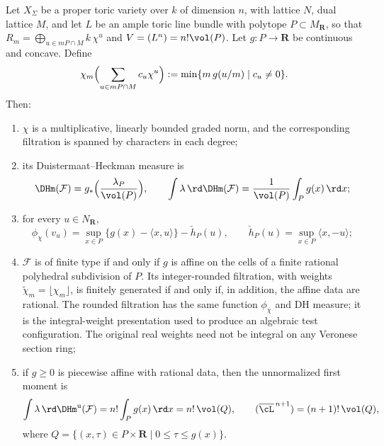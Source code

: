 \begin{theorem}
\label{thm:ch33-toric}
Let $X_\Sigma$ be a proper toric variety over $k$ of dimension $n$,
with lattice $N$, dual lattice $M$, and let $L$ be an ample toric
line bundle with polytope $P\subset M_{\mathbf R}$, so that
$R_m=\bigoplus_{u\in mP\cap M}k\,\chi^u$ and
$V=(L^n)=n!\vol(P)$.  Let $g:P\to\mathbf R$ be continuous and concave.
Define
\begin{equation}
\label{eq:ch33-toric-filtration}
 \chi_m\Bigl(\sum_{u\in mP\cap M}c_u\chi^u\Bigr)
 :=\min\{m\,g(u/m)\mid c_u\ne0\} .
\end{equation}
Then:
\begin{enumerate}
\item $\chi$ is a multiplicative, linearly bounded graded norm, and the
 corresponding filtration is spanned by characters in each degree;
\item its Duistermaat--Heckman measure is
\begin{equation}
\label{eq:ch33-toric-dh}
 \DHm(\mathcal F)=g_\ast\Bigl(\frac{\lambda_P}{\vol(P)}\Bigr),
 \qquad
 \int\lambda\,\rd\DHm(\mathcal F)
 =\frac1{\vol(P)}\int_Pg(x)\,\rd x ;
\end{equation}
\item for every $u\in N_{\mathbf R}$,
\begin{equation}
\label{eq:ch33-toric-fs}
 \phi_\chi(v_u)
 =\sup_{x\in P}\bigl\{g(x)-\langle x,u\rangle\bigr\}
   -\check h_P(u),
 \qquad
 \check h_P(u)=\sup_{x\in P}\langle x,-u\rangle ;
\end{equation}
\item $\mathcal F$ is of finite type if and only if $g$ is affine on
 the cells of a finite rational polyhedral subdivision of $P$.
 Its integer-rounded filtration, with weights
 $\widetilde\chi_m=\lfloor\chi_m\rfloor$, is finitely generated if and
 only if, in addition, the affine data are rational.  The rounded
 filtration has the same function $\phi_\chi$ and DH measure; it is
 the integral-weight presentation used to produce an algebraic test
 configuration.  The original real weights need not be integral on any
 Veronese section ring;
\item if $g\geq0$ is piecewise affine with rational data, then the
 unnormalized first moment is
\begin{equation}
\label{eq:ch33-toric-intersection}
 \int\lambda\,\rd\DHm^{\mathrm u}(\mathcal F)
 =n!\int_Pg(x)\,\rd x
 =n!\,\vol(Q),
 \qquad
 (\overline\cL^{\,n+1})=(n+1)!\,\vol(Q),
\end{equation}
 where $Q=\{(x,\tau)\in P\times\mathbf R\mid 0\leq\tau\leq g(x)\}$.
\end{enumerate}
\end{theorem}

